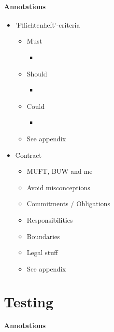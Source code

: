\paragraph{Annotations}

\begin{itemize}
	\item 'Pflichtenheft'-criteria
	\begin{itemize}
		\item Must
		\begin{itemize}
			\item 
		\end{itemize}
		\item Should
		\begin{itemize}
			\item 
		\end{itemize}
		\item Could
		\begin{itemize}
			\item 
		\end{itemize}
		\item See appendix
	\end{itemize}
	\item Contract 
		\begin{itemize}
			\item MUFT, BUW and me
			\item Avoid misconceptions
			\item Commitments / Obligations
			\item Responsibilities
			\item Boundaries
			\item Legal stuff
			\item See appendix
		\end{itemize}
\end{itemize}


\section{Testing}
\label{conception_testing}

\paragraph{Annotations}

